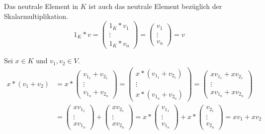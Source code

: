 \documentclass[a4paper,10pt]{article}
\begin{document}
Das neutrale Element in $K$ ist auch das neutrale Element bezüglich der Skalarmultiplikation.
\begin{equation*}
 1_K * v = \begin{pmatrix}1_K * v_1 \\ \vdots \\ 1_K * v_n\end{pmatrix} = \begin{pmatrix}v_1 \\ \vdots \\ v_n\end{pmatrix} = v
\end{equation*}

Sei $x \in K$ und $v_1, v_2 \in V$.
\begin{align*}
 x * (v_1 + v_2) & = x * \begin{pmatrix}v_{1_1} + v_{2_1} \\ \vdots \\ v_{1_n} + v_{2_n} \end{pmatrix} = \begin{pmatrix}x * (v_{1_1} + v_{2_1}) \\ \vdots \\ x * (v_{1_n} + v_{2_n}) \end{pmatrix} = \begin{pmatrix}xv_{1_1} + xv_{2_1} \\ \vdots \\ xv_{1_n} + xv_{2_n} \end{pmatrix}\\
 & = \begin{pmatrix}xv_{1_1} \\ \vdots \\ xv_{1_n} \end{pmatrix} + \begin{pmatrix}xv_{2_1} \\ \vdots \\ xv_{2_n} \end{pmatrix} = x * \begin{pmatrix}v_{1_1} \\ \vdots \\ v_{1_n} \end{pmatrix} + x * \begin{pmatrix}v_{2_1} \\ \vdots \\ v_{2_n} \end{pmatrix} = xv_1 + xv_2
\end{align*}
\end{document}
